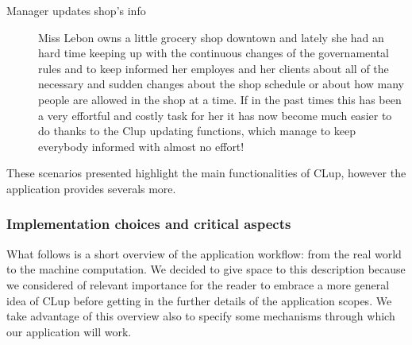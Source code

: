 \begin{description}
    \item[Manager updates shop's info]
    Miss Lebon owns a little grocery shop downtown and lately she had an hard time keeping up with the continuous changes of the governamental rules and to keep informed her employes and her clients about all of the necessary and sudden changes about the shop schedule or about how many people are allowed in the shop at a time. If in the past times this has been a very effortful and costly task for her it has now become much easier to do thanks to the Clup updating functions, which manage to keep everybody informed with almost no effort! 
\end{description}

These scenarios presented highlight the main functionalities of CLup, however the application provides severals more. 

\subsubsection{Implementation choices and critical aspects}
\label{subsubsect:criticalaspects}


What follows is  a short overview of the application workflow: from the real world to the machine computation.
We decided to give space to this description because we considered of relevant importance for the reader to embrace a more general idea of CLup before getting in the further details of the application scopes.
We take advantage of this overview also to specify some mechanisms through which our application will work.


